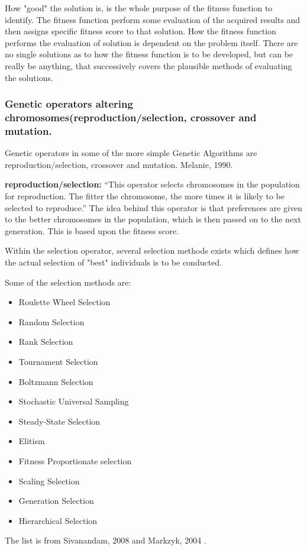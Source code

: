 How "good" the solution is, is the whole purpose of the fitness function to identify. The fitness function perform some evaluation of the acquired results and then assigns specific fitness score to that solution. How the fitness function performs the evaluation of solution is dependent on the problem itself. There are no single solutions as to how the fitness function is to be developed, but can be really be anything, that successively covers the plausible methods of evaluating the solutions. \cite[pp. 31]{Sivanandam2008}

\subsubsection*{Genetic operators altering chromosomes(reproduction/selection, crossover and mutation.}


Genetic operators in some of the more simple Genetic Algorithms are reproduction/selection, crossover and mutation. Melanie, 1990. \cite{Melanie1990}

\textbf{reproduction/selection:} \enquote{This operator selects chromosomes in the population for reproduction. The fitter the chromosome, the more times it is likely to be selected to reproduce.} \cite[pp. 8]{Melanie1990}
The idea behind this operator is that preferences are given to the better chromosomes in the population, which is then passed on to the next generation. This is based upon the fitness score.

Within the selection operator, several selection methods exists which defines how the actual selection of "best" individuals is to be conducted.

Some of the selection methods are:
\begin{itemize}
\item Roulette Wheel Selection
\item Random Selection
\item Rank Selection
\item Tournament Selection
\item Boltzmann Selection
\item Stochastic Universal Sampling
\item Steady-State Selection
\item Elitism
\item Fitness Proportionate selection
\item Scaling Selection
\item Generation Selection
\item Hierarchical Selection
\end{itemize}
The list is from Sivanandam, 2008 \cite[pp. 46-50]{Sivanandam2008} and Markzyk, 2004 \cite{Adam2004}.

